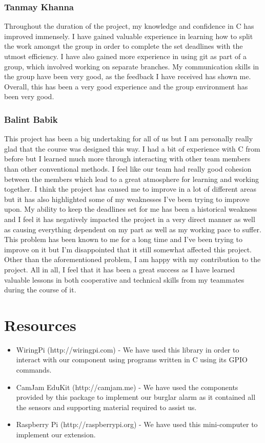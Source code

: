 \documentclass[11pt]{article}
\begin{document}
\subsubsection{Tanmay Khanna}
Throughout the duration of the project, my knowledge and confidence in C has improved immensely. I have gained valuable experience in learning how to split the work amongst the group in order to complete the set deadlines with the utmost efficiency. I have also gained more experience in using git as part of a group, which involved working on separate branches. My communication skills in the group have been very good, as the feedback I have received has shown me. Overall, this has been a very good experience and the group environment has been very good.

\subsubsection{Balint Babik}
This project has been a big undertaking for all of us but I am personally really glad that the course was designed this way. I had a bit of experience with C from before but I learned much more through interacting with other team members than other conventional methods. I feel like our team had really good cohesion between the members which lead to a great atmosphere for learning  and  working together. 
I think the project has caused me to improve in a lot of different areas but it has also highlighted some of my weaknesses I've been trying to improve upon. My ability to keep the deadlines set for me has been a historical weakness and I feel it has negatively impacted the project in a very direct manner as well as causing everything dependent on my part as well as my working pace to suffer. This problem has been known to me for a long time and I've been trying to improve on it but I'm disappointed that it still somewhat affected this project.
Other than the aforementioned problem, I am happy with my contribution to the project. All in all, I feel that it has been a great success as I have learned valuable lessons in both cooperative and technical skills from my teammates during the course of it. 

\section{Resources}
\begin{itemize}
\item WiringPi (http://wiringpi.com) - We have used this library in order to interact with our component using programs written in C using its GPIO commands.
\item CamJam EduKit (http://camjam.me) - We have used the components provided by this package to implement our burglar alarm as it contained all the sensors and supporting material required to assist us.
\item Raspberry Pi (http://raspberrypi.org) - We have used this mini-computer to implement our extension.
\end{itemize}
\end{document}
